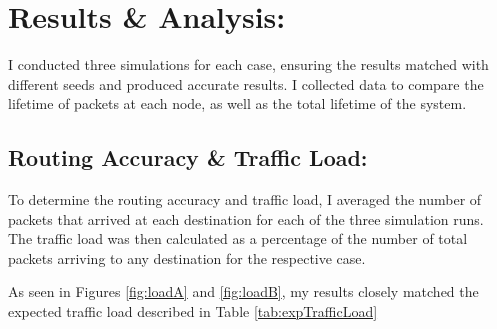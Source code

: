 \documentclass{article}
\begin{document}
\newpage
\section{Results \& Analysis:}
\label{sec:Results}
I conducted three simulations for each case, ensuring the results matched with different seeds and produced accurate results.
I collected data to compare the lifetime of packets at each node, as well as the total lifetime of the system.

\subsection{Routing Accuracy \& Traffic Load:}
\label{subsec:RoutingResults}
To determine the routing accuracy and traffic load, I averaged the number of packets that arrived at each destination for each of the three simulation runs.  
The traffic load was then calculated as a percentage of the number of total packets arriving to any destination for the respective case.

As seen in Figures \ref{fig:loadA} and \ref{fig:loadB}, my results closely matched the expected traffic load described in Table \ref{tab:expTrafficLoad}
\end{document}
